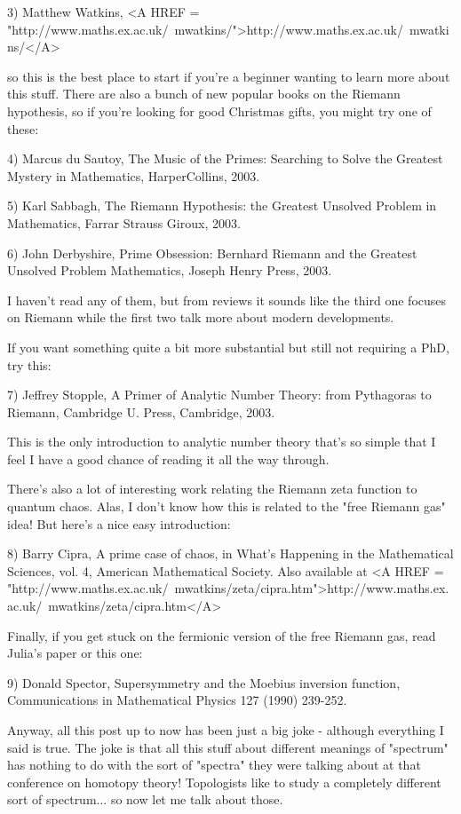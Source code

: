3) Matthew Watkins, <A HREF = "http://www.maths.ex.ac.uk/~mwatkins/">http://www.maths.ex.ac.uk/~mwatkins/</A>

so this is the best place to start if you're a beginner wanting to
learn more about this stuff.  There are also a bunch of new popular
books on the Riemann hypothesis, so if you're looking for good
Christmas gifts, you might try one of these:

4) Marcus du Sautoy, The Music of the Primes: Searching to Solve the Greatest
Mystery in Mathematics, HarperCollins, 2003.

5) Karl Sabbagh, The Riemann Hypothesis: the Greatest Unsolved Problem
in Mathematics, Farrar Strauss \text{\&}  Giroux, 2003.

6) John Derbyshire, Prime Obsession: Bernhard Riemann and the Greatest 
Unsolved Problem Mathematics, Joseph Henry Press, 2003.

I haven't read any of them, but from reviews it sounds like the third
one focuses on Riemann while the first two talk more about modern
developments.

If you want something quite a bit more substantial but still not requiring
a PhD, try this:

7) Jeffrey Stopple, A Primer of Analytic Number Theory: from Pythagoras
to Riemann, Cambridge U. Press, Cambridge, 2003.

This is the only introduction to analytic number theory that's so simple that
I feel I have a good chance of reading it all the way through.

There's also a lot of interesting work relating the Riemann zeta
function to quantum chaos.  Alas, I don't know how this is related to
the "free Riemann gas" idea!  But here's a nice easy introduction:

8) Barry Cipra, A prime case of chaos, in What's Happening in the 
Mathematical Sciences, vol. 4, American Mathematical Society.  Also 
available at <A HREF = "http://www.maths.ex.ac.uk/~mwatkins/zeta/cipra.htm">http://www.maths.ex.ac.uk/~mwatkins/zeta/cipra.htm</A>

Finally, if you get stuck on the fermionic version of the free Riemann
gas, read Julia's paper or this one:

9) Donald Spector, Supersymmetry and the Moebius inversion function,
Communications in Mathematical Physics 127 (1990) 239-252.

Anyway, all this post up to now has been just a big joke - although everything
I said is true.  The joke is that all this stuff about different meanings of 
"spectrum" has nothing to do with the sort of "spectra" they were
talking about at that conference on homotopy theory!  Topologists like to
study a completely different sort of spectrum... so now let me talk about
those.
 
